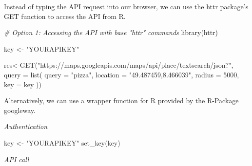 \documentclass[
]{book}
\newenvironment{Shaded}{\begin{snugshade}}{\end{snugshade}}
\newcommand{\AttributeTok}[1]{\textcolor[rgb]{0.77,0.63,0.00}{#1}}
\newcommand{\CommentTok}[1]{\textcolor[rgb]{0.56,0.35,0.01}{\textit{#1}}}
\newcommand{\DecValTok}[1]{\textcolor[rgb]{0.00,0.00,0.81}{#1}}
\newcommand{\FunctionTok}[1]{\textcolor[rgb]{0.00,0.00,0.00}{#1}}
\newcommand{\NormalTok}[1]{#1}
\newcommand{\OtherTok}[1]{\textcolor[rgb]{0.56,0.35,0.01}{#1}}
\newcommand{\StringTok}[1]{\textcolor[rgb]{0.31,0.60,0.02}{#1}}
\begin{document}
Instead of typing the API request into our browser, we can use the httr package's GET function to access the API from R.

\begin{Shaded}
\begin{Highlighting}[]
\CommentTok{\# Option 1: Accessing the API with base "httr" commands}
\FunctionTok{library}\NormalTok{(httr)}

\NormalTok{key }\OtherTok{\textless{}{-}} \StringTok{"YOURAPIKEY"}

\NormalTok{res}\OtherTok{\textless{}{-}}\FunctionTok{GET}\NormalTok{(}\StringTok{"https://maps.googleapis.com/maps/api/place/textsearch/json?"}\NormalTok{, }\AttributeTok{query =} \FunctionTok{list}\NormalTok{(}
           \AttributeTok{query =} \StringTok{"pizza"}\NormalTok{,}
           \AttributeTok{location =} \StringTok{"49.487459,8.466039"}\NormalTok{,}
           \AttributeTok{radius =} \DecValTok{5000}\NormalTok{,}
           \AttributeTok{key =}\NormalTok{ key}
\NormalTok{         ))}
\end{Highlighting}
\end{Shaded}

Alternatively, we can use a wrapper function for R provided by the R-Package googleway.

\emph{Authentication}

\begin{Shaded}
\begin{Highlighting}[]
\NormalTok{key }\OtherTok{\textless{}{-}} \StringTok{"YOURAPIKEY"}
\FunctionTok{set\_key}\NormalTok{(key)}
\end{Highlighting}
\end{Shaded}

\emph{API call}
\end{document}
